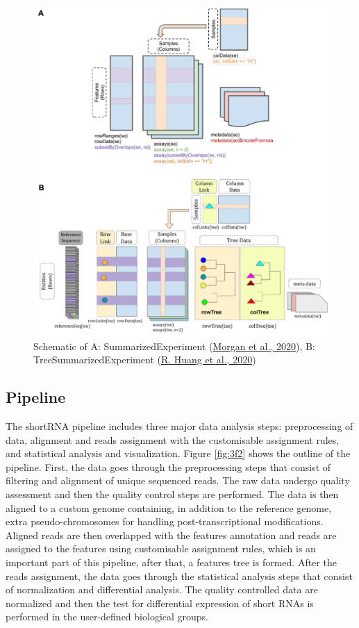 \documentclass[12pt,twoside]{reedthesis}
\begin{document}
\begin{figure}[H]

{\centering \includegraphics{thesis_files/figure-latex/3f1-1} 

}

\caption{Schematic of A: SummarizedExperiment (\protect\hyperlink{ref-morgan2020}{Morgan et al., 2020}), B: TreeSummarizedExperiment (\protect\hyperlink{ref-huang2020}{R. Huang et al., 2020})}\label{fig:3f1}
\end{figure}
\hypertarget{pipeline}{%
\subsection{Pipeline}\label{pipeline}}

The shortRNA pipeline includes three major data analysis steps:
preprocessing of data, alignment and reads assignment with the
customisable assignment rules, and statistical analysis and
visualization. Figure \ref{fig:3f2} shows the outline of the pipeline. First, the
data goes through the preprocessing steps that consist of filtering and
alignment of unique sequenced reads. The raw data undergo quality
assessment and then the quality control steps are performed. The data is
then aligned to a custom genome containing, in addition to the reference
genome, extra pseudo-chromosomes for handling post-transcriptional
modifications. Aligned reads are then overlapped with the features
annotation and reads are assigned to the features using customisable
assignment rules, which is an important part of this pipeline, after
that, a features tree is formed. After the reads assignment, the data
goes through the statistical analysis steps that consist of
normalization and differential analysis. The quality controlled data are
normalized and then the test for differential expression of short RNAs
is performed in the user-defined biological groups.
\end{document}
